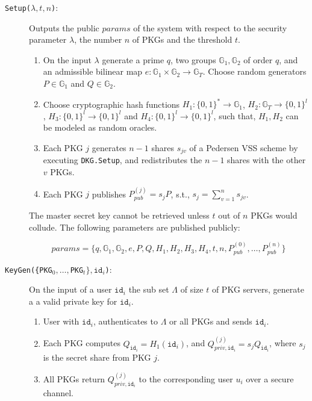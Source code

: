 \documentclass{llncs}
\newcommand{\id}[1]{\ensuremath{\mathtt{id}_{#1}}}
\begin{document}
\begin{description}
    \item[\texttt{Setup($\lambda, t, n$)}:] Outputs the public $params$ of the system with respect to the security parameter $\lambda$, the number $n$ of PKGs and the threshold $t$.

    \begin{enumerate}
        \item On the input $\lambda$ generate a prime $q$, two groups $\mathbb{G}_1, \mathbb{G}_2$ of order $q$, and an admissible bilinear map $e: \mathbb{G}_1 \times \mathbb{G}_2 \rightarrow \mathbb{G}_T$. Choose random generators $P \in \mathbb{G}_1$ and $Q \in \mathbb{G}_2$. 
    
        \item Choose cryptographic hash functions $H_1: \{ 0,1 \}^{*} \rightarrow \mathbb{G}_1$, ${H_2: \mathbb{G}_T \rightarrow \{ 0,1 \}^{l}}$, $H_3: \{ 0, 1 \}^{l} \rightarrow \{ 0,1 \}^{l}$ and $H_4: \{ 0, 1 \}^{l} \rightarrow \{ 0,1 \}^{l}$, such that, $H_1, H_2$ can be modeled as random oracles.
        
        \item Each PKG $j$ generates $n-1$ shares $s_{jv}$ of a Pedersen VSS scheme by executing \texttt{DKG.Setup}, and redistributes the $n-1$ shares with the other $v$ PKGs.

        \item Each PKG $j$ publishes $P_{pub}^{(j)} = s_j P$, s.t., $s_j=\sum_{v=1}^n s_{jv}$.
    \end{enumerate}
    
    The master secret key cannot be retrieved unless $t$ out of $n$ PKGs would collude. The following parameters are published publicly:
    
    \begin{equation*}
    params = \{ q, \mathbb{G}_1, \mathbb{G}_2, e, P, Q, H_1, H_2, H_3, H_4, t, n, P_{pub}^{(0)}, \ldots, P_{pub}^{(n)} \}
    \end{equation*}
    
    \bigskip

    \item[\texttt{KeyGen(\{PKG$_0,\ldots,$PKG$_t\}, \id{i}$)}:] On the input of a user $\id{i}$ the sub set $\Lambda$ of size $t$ of PKG servers, generate a a valid private key for \id{i}. 
    
    \begin{enumerate}
        \item User with \id{i}, authenticates to $\Lambda$ or all PKGs and sends \id{i}.
        \item Each PKG computes $Q_{\id{i}} = H_1 \left( \id{i} \right)$, and $Q_{priv,\id{i}}^{(j)} = s_j Q_{\id{i}}$, where $s_j$ is the secret share from PKG $j$.
        \item All PKGs return $Q_{priv,\id{i}}^{(j)}$ to the corresponding user $u_i$ over a secure channel.
    

\end{enumerate}
\end{description}
\end{document}

